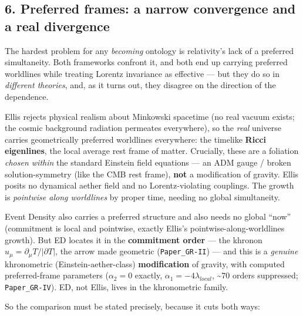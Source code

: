 \documentclass[
  11pt,
]{article}
\begin{document}
\subsection{6. Preferred frames: a narrow convergence and a real
divergence}\label{preferred-frames-a-narrow-convergence-and-a-real-divergence}

The hardest problem for any \emph{becoming} ontology is relativity's
lack of a preferred simultaneity. Both frameworks confront it, and both
end up carrying preferred worldlines while treating Lorentz invariance
as effective --- but they do so in \emph{different theories}, and, as it
turns out, they disagree on the direction of the dependence.

Ellis rejects physical realism about Minkowski spacetime (no real vacuum
exists; the cosmic background radiation permeates everywhere), so the
\emph{real} universe carries geometrically preferred worldlines
everywhere: the timelike \textbf{Ricci eigenlines}, the local average
rest frame of matter. Crucially, these are a foliation \emph{chosen
within} the standard Einstein field equations --- an ADM gauge / broken
solution-symmetry (like the CMB rest frame), \textbf{not} a modification
of gravity. Ellis posits no dynamical aether field and no
Lorentz-violating couplings. The growth is \emph{pointwise along
worldlines} by proper time, needing no global simultaneity.

Event Density also carries a preferred structure and also needs no
global ``now'' (commitment is local and pointwise, exactly Ellis's
pointwise-along-worldlines growth). But ED locates it in the
\textbf{commitment order} --- the khronon
\(u_\mu = \partial_\mu T/|\partial T|\), the arrow made geometric
(\texttt{Paper\_GR-II}) --- and this is a \emph{genuine} khronometric
(Einstein-aether-class) \textbf{modification} of gravity, with computed
preferred-frame parameters (\(\alpha_{2} = 0\) exactly,
\(\alpha_{1} = -4\lambda_{local}\), \textasciitilde70 orders suppressed;
\texttt{Paper\_GR-IV}). ED, not Ellis, lives in the khronometric family.

So the comparison must be stated precisely, because it cuts both ways:
\end{document}
